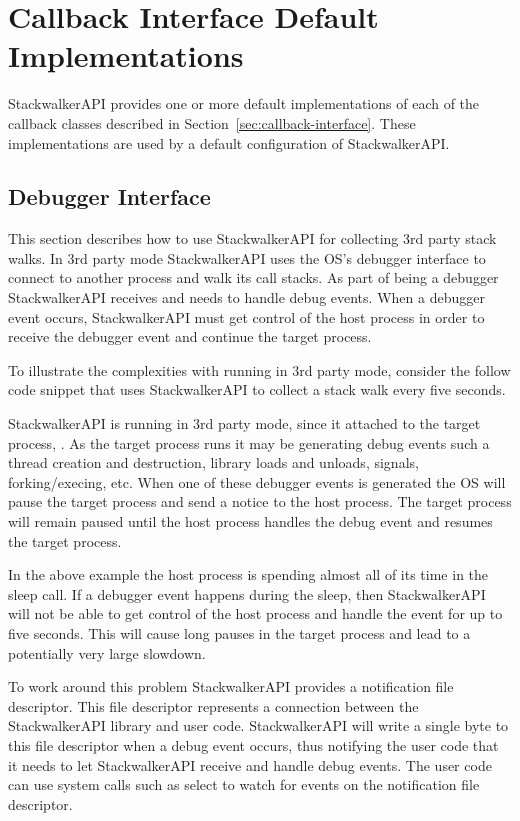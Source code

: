 \section{Callback Interface Default Implementations}

StackwalkerAPI provides one or more default implementations of each of the
callback classes described in Section~\ref{sec:callback-interface}. These implementations are used by a
default configuration of StackwalkerAPI.

\subsection{Debugger Interface}
\label{subsec:debugger}

This section describes how to use StackwalkerAPI for collecting 3rd party stack
walks. In 3rd party mode StackwalkerAPI uses the OS's debugger interface to
connect to another process and walk its call stacks. As part of being a debugger
StackwalkerAPI receives and needs to handle debug events. When a debugger event
occurs, StackwalkerAPI must get control of the host process in order to receive
the debugger event and continue the target process.

To illustrate the complexities with running in 3rd party mode, consider the
follow code snippet that uses StackwalkerAPI to collect a stack walk every five
seconds.



StackwalkerAPI is running in 3rd party mode, since it attached to the target
process, . As the target process runs it may be generating debug events such
a thread creation and destruction, library loads and unloads, signals,
forking/execing, etc. When one of these debugger events is generated the OS will
pause the target process and send a notice to the host process. The target
process will remain paused until the host process handles the debug event and
resumes the target process.

In the above example the host process is spending almost all of its time in the
sleep call. If a debugger event happens during the sleep, then StackwalkerAPI
will not be able to get control of the host process and handle the event for up
to five seconds. This will cause long pauses in the target process and lead to a
potentially very large slowdown.

To work around this problem StackwalkerAPI provides a notification file
descriptor. This file descriptor represents a connection between the
StackwalkerAPI library and user code. StackwalkerAPI will write a single byte to
this file descriptor when a debug event occurs, thus notifying the user code
that it needs to let StackwalkerAPI receive and handle debug events. The user
code can use system calls such as select to watch for events on the notification
file descriptor.


